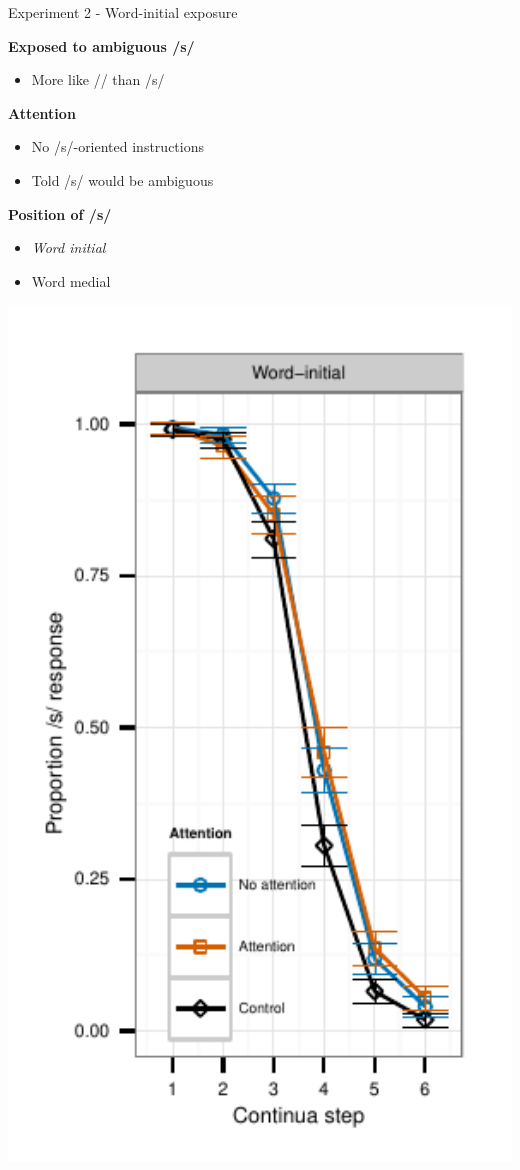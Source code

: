 \documentclass{beamer}
\begin{document}
\begin{frame}{Experiment 2 - Word-initial exposure}

\begin{minipage}{0.45\textwidth}
\textbf{Exposed to ambiguous /s/}
\begin{itemize}
\item More like /\textesh/ than /s/
\end{itemize}

\textbf{Attention}
\begin{itemize}
\item No /s/-oriented instructions
\item Told /s/ would be ambiguous
\end{itemize}

\textbf{Position of /s/}
\begin{itemize}
\item \emph{Word initial}
\item Word medial
\end{itemize}
\end{minipage}
\hfill
\begin{minipage}{0.4\textwidth}
\includegraphics[width=1.0\textwidth]{graphs/exp2_categresults_present2-initial}
\end{minipage}


\end{frame}
\end{document}

